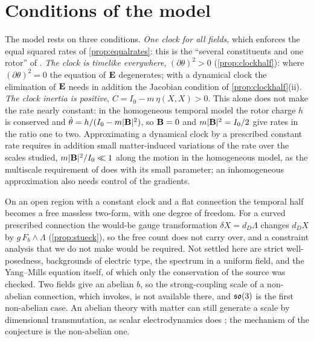 \section{Conditions of the model}

The model rests on three conditions. \emph{One clock for all fields}, which enforces the equal squared rates of \cref{prop:equalrates}:
this is the ``several constituents and one rotor'' of . \emph{The clock is timelike everywhere}, $(\partial\theta)^2>0$
(\cref{prop:clockhalf}): where $(\partial\theta)^2=0$ the equation of $\mathbf E$ degenerates; with a dynamical clock the elimination of $\mathbf E$
needs in addition the Jacobian condition of \cref{prop:clockhalf}(ii). \emph{The clock inertia is positive}, $C=I_0-m\,\eta(X,X)>0$. This alone does not make the rate nearly constant: in the homogeneous
temporal model the rotor charge $h$ is conserved and $\dot\theta=h/(I_0-m|\mathbf B|^2)$, so $\mathbf B=0$ and $m|\mathbf B|^2=I_0/2$ give rates in the ratio
one to two. Approximating a dynamical clock by a prescribed constant rate requires in addition small matter-induced variations of the rate
over the scales studied, $m|\mathbf B|^2/I_0\ll1$ along the motion in the homogeneous model, as the multiscale requirement of 
does with its small parameter; an inhomogeneous approximation also needs control of the gradients.

On an open region with a constant clock and a flat connection the temporal half becomes a free massless two-form, with one degree of
freedom. For a curved prescribed connection the would-be gauge transformation $\delta X=d_D\Lambda$ changes $d_DX$ by $g\,F_b\wedge\Lambda$
(\cref{prop:stueck}), so the free count does not carry over, and a constraint analysis that we do not make would be required. Not settled
here are strict well-posedness, backgrounds of electric type, the spectrum in a uniform field, and the Yang--Mills equation itself, of which
only the conservation of the source was checked. Two fields give an abelian $b$, so the strong-coupling scale of a non-abelian connection,
which  invokes, is not available there, and $\mathfrak{so}(3)$ is the first non-abelian case. An abelian theory with matter can still
generate a scale by dimensional transmutation, as scalar electrodynamics does \cite{ColemanWeinberg73}; the mechanism of the conjecture is
the non-abelian one.
